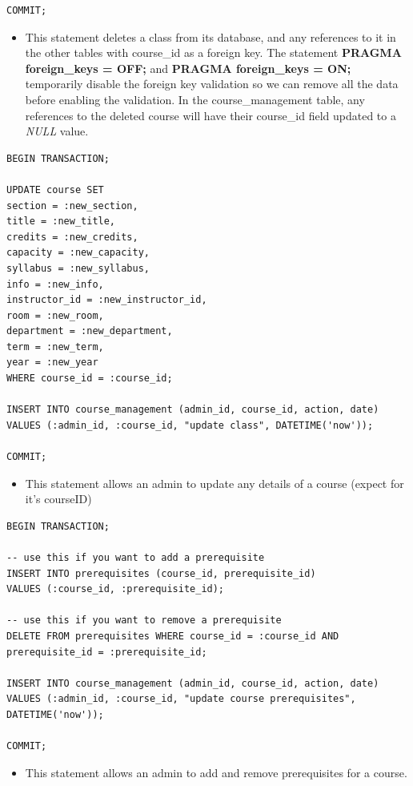 \documentclass{report}
\begin{document}
\begin{itemize}
\begin{lstlisting}
COMMIT;
    \end{lstlisting}
    \begin{itemize}
        \item This statement deletes a class from its database, and any references to it in the other tables with course\_id as a foreign key. The statement \textbf{PRAGMA foreign\_keys = OFF;} and \textbf{PRAGMA foreign\_keys = ON;} temporarily disable the foreign key validation so we can remove all the data before enabling the validation. In the course\_management table, any references to the deleted course will have their course\_id field updated to a \textit{NULL} value.
    \end{itemize}
    \begin{lstlisting}
BEGIN TRANSACTION;

UPDATE course SET
section = :new_section,
title = :new_title,
credits = :new_credits,
capacity = :new_capacity,
syllabus = :new_syllabus,
info = :new_info,
instructor_id = :new_instructor_id,
room = :new_room,
department = :new_department,
term = :new_term,
year = :new_year
WHERE course_id = :course_id;

INSERT INTO course_management (admin_id, course_id, action, date)
VALUES (:admin_id, :course_id, "update class", DATETIME('now'));

COMMIT;
    \end{lstlisting}
    \begin{itemize}
        \item This statement allows an admin to update any details of a course (expect for it's courseID)
    \end{itemize}
    \begin{lstlisting}
BEGIN TRANSACTION;

-- use this if you want to add a prerequisite
INSERT INTO prerequisites (course_id, prerequisite_id)
VALUES (:course_id, :prerequisite_id);

-- use this if you want to remove a prerequisite
DELETE FROM prerequisites WHERE course_id = :course_id AND prerequisite_id = :prerequisite_id;

INSERT INTO course_management (admin_id, course_id, action, date)
VALUES (:admin_id, :course_id, "update course prerequisites", DATETIME('now'));

COMMIT;
    \end{lstlisting}
    \begin{itemize}
        \item This statement allows an admin to add and remove prerequisites for a course.
    \end{itemize}
    

\end{itemize}
\end{document}
